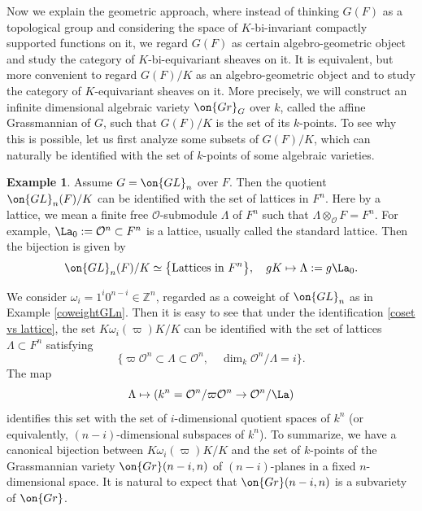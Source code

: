 \documentclass[11pt]{amsart}
\theoremstyle{definition}
\theoremstyle{definition}
\newtheorem{ex}[thm]{Example}
\theoremstyle{definition}
\numberwithin{equation}{subsection}
\newcommand{\bZ}{{\mathbb Z}}
\newcommand{\mO}{{\mathcal O}}
\newcommand{\Gr}{{\on{Gr}}}
\newcommand{\GL}{{\on{GL}}}
\begin{document}
\medskip

Now we explain the geometric approach, where instead of thinking $G(F)$ as a topological group and considering the space of $K$-bi-invariant compactly supported functions on it, we regard $G(F)$ as certain algebro-geometric object and study the category of $K$-bi-equivariant sheaves on it. It is equivalent, but more convenient to regard $G(F)/K$ as an algebro-geometric object and to study the category of $K$-equivariant sheaves on it. More precisely, we will construct an infinite dimensional algebraic variety $\Gr_G$ over $k$, called the affine Grassmannian of $G$, such that $G(F)/K$ is the set of its $k$-points. 
To see why this is possible, let us first analyze some subsets of $G(F)/K$, which can naturally be identified with the set of $k$-points of some algebraic varieties.

\begin{ex}\label{minu Sch}
Assume $G=\GL_n$ over $F$. Then the quotient $\GL_n(F)/K$ can be identified with the set of lattices in $F^n$. Here by a lattice, we mean a finite free $\mO$-submodule $\Lambda$ of $F^n$ such that $\Lambda\otimes_{\mO}F=F^n$. For example, $\La_0:=\mO^n\subset F^n$ is a lattice, usually called the standard lattice. Then the bijection is given by
\begin{equation}\label{coset vs lattice}
\GL_n(F)/K\simeq \big\{\mbox{Lattices in } F^n\big\},\quad gK\mapsto \Lambda:=g\La_0.
\end{equation}

We consider $\omega_i=1^i0^{n-i}\in \bZ^{n}$, regarded as a coweight of $\GL_n$ as in Example \ref{coweightGLn}. Then it is easy to see that 
under the identification \eqref{coset vs lattice}, the set $K\omega_i(\varpi)K/K$ can be identified with the set of lattices $\Lambda\subset F^n$ satisfying
\[\big\{\varpi\mO^n\subset \Lambda \subset \mO^n,\quad  \dim_{k}\mO^n/\Lambda=i\big\}.\]
The map 
$$\Lambda\mapsto (k^n=\mO^n/\varpi\mO^n\to \mO^n/\La)$$
identifies this set with the set of $i$-dimensional quotient spaces of $k^n$ (or equivalently, $(n-i)$-dimensional subspaces of $k^n$). To summarize, we have a canonical bijection between $K\omega_i(\varpi)K/K$ and the set of $k$-points of the Grassmannian variety $\Gr(n-i,n)$ of $(n-i)$-planes in a fixed $n$-dimensional space. It is natural to expect that $\Gr(n-i,n)$ is a subvariety of  $\Gr$.
\end{ex}
\end{document}
